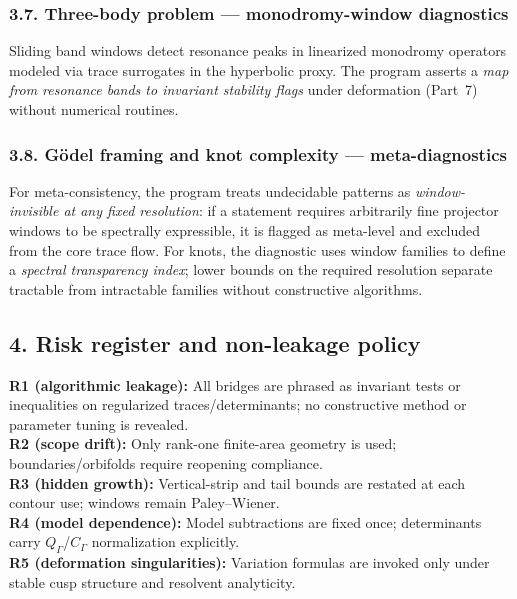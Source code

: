 \subsubsection*{3.7. Three-body problem — monodromy-window diagnostics}\relax\hspace{0pt}
\label{subsubsec:tfc8-3body} %

Sliding band windows detect resonance peaks in linearized monodromy operators modeled via trace surrogates in the hyperbolic proxy. The program asserts a \emph{map from resonance bands to invariant stability flags} under deformation (Part~7) without numerical routines. \relax\hspace{0pt}

\subsubsection*{3.8. G\"odel framing and knot complexity — meta-diagnostics}\relax\hspace{0pt}
\label{subsubsec:tfc8-goedel-knot} %

For meta-consistency, the program treats undecidable patterns as \emph{window-invisible at any fixed resolution}: if a statement requires arbitrarily fine projector windows to be spectrally expressible, it is flagged as meta-level and excluded from the core trace flow. For knots, the diagnostic uses window families to define a \emph{spectral transparency index}; lower bounds on the required resolution separate tractable from intractable families without constructive algorithms. \relax\hspace{0pt}

\subsection*{4. Risk register and non-leakage policy}\relax\hspace{0pt}
\label{subsec:tfc8-risk} %

\noindent
\textbf{R1 (algorithmic leakage):} All bridges are phrased as invariant tests or inequalities on regularized traces/determinants; no constructive method or parameter tuning is revealed. \\
\textbf{R2 (scope drift):} Only rank-one finite-area geometry is used; boundaries/orbifolds require reopening compliance. \\
\textbf{R3 (hidden growth):} Vertical-strip and tail bounds are restated at each contour use; windows remain Paley--Wiener. \\
\textbf{R4 (model dependence):} Model subtractions are fixed once; determinants carry $Q_\Gamma$/$C_\Gamma$ normalization explicitly. \\
\textbf{R5 (deformation singularities):} Variation formulas are invoked only under stable cusp structure and resolvent analyticity. \relax\hspace{0pt}

